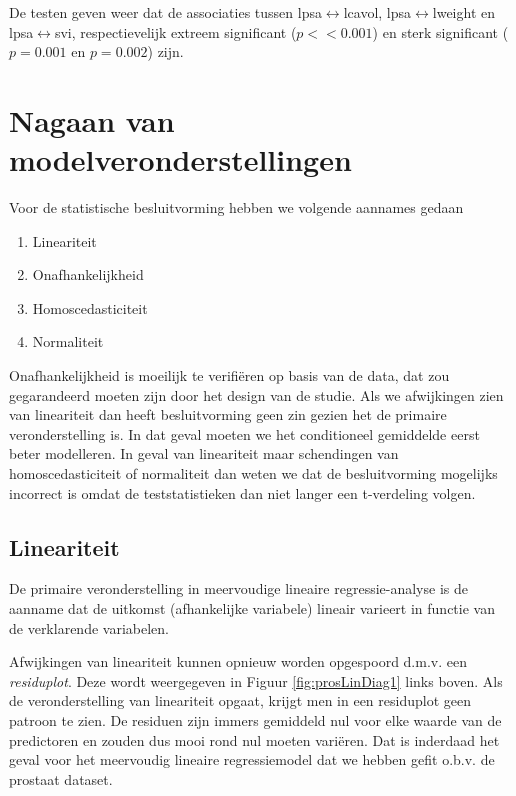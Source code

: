 \documentclass[
  12pt,dutch]{book}
\providecommand{\tightlist}{%
  \setlength{\itemsep}{0pt}\setlength{\parskip}{0pt}}
\theoremstyle{definition}
\theoremstyle{definition}
\theoremstyle{definition}
\theoremstyle{definition}
\theoremstyle{remark}
\begin{document}
De testen geven weer dat de associaties tussen lpsa\(\leftrightarrow\)lcavol, lpsa\(\leftrightarrow\)lweight en lpsa\(\leftrightarrow\)svi, respectievelijk extreem significant (\(p << 0.001\)) en sterk significant (\(p=0.001\) en \(p=0.002\)) zijn.

\section{Nagaan van modelveronderstellingen}\label{nagaan-van-modelveronderstellingen-1}

Voor de statistische besluitvorming hebben we volgende aannames gedaan

\begin{enumerate}
\def\labelenumi{\arabic{enumi}.}
\tightlist
\item
  Lineariteit
\item
  Onafhankelijkheid\\
\item
  Homoscedasticiteit
\item
  Normaliteit
\end{enumerate}

Onafhankelijkheid is moeilijk te verifiëren op basis van de data, dat zou gegarandeerd moeten zijn door het design van de studie.
Als we afwijkingen zien van lineariteit dan heeft besluitvorming geen zin gezien het de primaire veronderstelling is.
In dat geval moeten we het conditioneel gemiddelde eerst beter modelleren.
In geval van lineariteit maar schendingen van homoscedasticiteit of normaliteit dan weten we dat de besluitvorming mogelijks incorrect is omdat de teststatistieken dan niet langer een t-verdeling volgen.

\subsection{Lineariteit}\label{lineariteit-1}

De primaire veronderstelling in meervoudige lineaire regressie-analyse is de aanname dat de uitkomst (afhankelijke variabele) lineair varieert in functie van de verklarende variabelen.

Afwijkingen van lineariteit kunnen opnieuw worden opgespoord d.m.v. een \emph{residuplot}. Deze wordt weergegeven in Figuur \ref{fig:prosLinDiag1} links boven. Als de veronderstelling van lineariteit opgaat, krijgt men in een residuplot geen patroon te zien.
De residuen zijn immers gemiddeld nul voor elke waarde van de predictoren en zouden dus mooi rond nul moeten variëren.
Dat is inderdaad het geval voor het meervoudig lineaire regressiemodel dat we hebben gefit o.b.v. de prostaat dataset.
\end{document}
